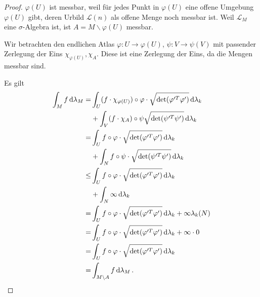 \documentclass[12pt]{revtex4-2}
\theoremstyle{definition}
\theoremstyle{definition}
\begin{document}
\begin{proof}
	$\varphi(U)$ ist messbar, weil f\"{u}r jedes Punkt in $\varphi(U)$ eine offene Umgebung $\varphi(U)$ gibt, deren Urbild $\mathcal{L}(n)$ als offene Menge noch messbar ist. Weil $\mathcal{L}_M$ eine $\sigma$-Algebra ist, ist $A=M\backslash \varphi(U)$ messbar.

	Wir betrachten den endlichen Atlas $\varphi:U\to \varphi(U)$, $\psi:V\to \psi(V)$ mit passender Zerlegung der Eins $\chi_{\varphi(U)}, \chi_{A}$. Diese ist eine Zerlegung der Eins, da die Mengen messbar sind.

	Es gilt
	\begin{align*}
		\int_M f\dd{\lambda_M}=&\int_{U}(f\cdot \chi_{\varphi(U)})\circ\varphi \cdot \sqrt{\text{det}(\varphi^{\prime T}\varphi')} \dd{\lambda_k}\\
				       &+\int_V (f\cdot \chi_{A})\circ \psi \sqrt{\text{det}(\psi^{\prime T}\psi')}\dd{\lambda_k}\\
		=&\int_U f\circ\varphi\cdot \sqrt{\text{det}(\varphi^{\prime T}\varphi')} \dd{\lambda_k}\\
		 &+\int_N  f\circ\psi\cdot \sqrt{\text{det}(\psi^{\prime T}\psi')} \dd{\lambda_k}\\
		\le&\int_U f\circ\varphi\cdot \sqrt{\text{det}(\varphi^{\prime T}\varphi')} \dd{\lambda_k}\\
		 &+\int_N  \infty\dd{\lambda_k}\\
		=&\int_U f\circ\varphi\cdot \sqrt{\text{det}(\varphi^{\prime T}\varphi')} \dd{\lambda_k}+\infty\lambda_k(N)\\
		=&\int_U f\circ\varphi\cdot \sqrt{\text{det}(\varphi^{\prime T}\varphi')} \dd{\lambda_k}+\infty\cdot 0\\
		=&\int_U f\circ\varphi\cdot \sqrt{\text{det}(\varphi^{\prime T}\varphi')} \dd{\lambda_k}\\
		=&\int_{M\backslash A}f\dd{\lambda_M}.\qedhere
	\end{align*}
\end{proof}
\end{document}
